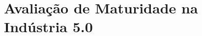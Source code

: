 
\chapter{Avaliação de Maturidade na Indústria 5.0}

\begin{comment}
\section{Fundamentos de Avaliação de Maturidade}
\subsection{Conceitos de modelos de maturidade organizacional}
\subsection{Objetivos da avaliação de maturidade em contextos industriais}
\subsection{Diferenças entre modelos genéricos e específicos}
\subsection{Relação entre maturidade e transformação digital}

\section{Modelos de Maturidade na Indústria 4.0}

\subsection{Revisão de modelos consolidados para Indústria 4.0 }
\subsubsection{Modelo de Schumacher}

\end{comment}
